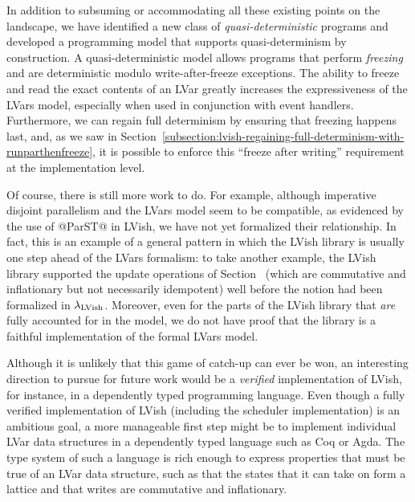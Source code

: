 In addition to subsuming or accommodating all these existing points on
the landscape, we have identified a new class of
\emph{quasi-deterministic} programs and developed a programming model
that supports quasi-determinism by construction.  A
quasi-deterministic model allows programs that perform \emph{freezing}
and are deterministic modulo write-after-freeze exceptions.  The
ability to freeze and read the exact contents of an LVar greatly
increases the expressiveness of the LVars model, especially when used
in conjunction with event handlers.  Furthermore, we can regain full
determinism by ensuring that freezing happens last, and, as we saw in
Section~\ref{subsection:lvish-regaining-full-determinism-with-runparthenfreeze},
it is possible to enforce this ``freeze after writing'' requirement at
the implementation level.

Of course, there is still more work to do.  For example, although
imperative disjoint parallelism and the LVars model seem to be
compatible, as evidenced by the use of @ParST@ in LVish, we have not
yet formalized their relationship.  In fact, this is an example of a
general pattern in which the LVish library is usually one step ahead
of the LVars formalism: to take another example, the LVish library
supported the update operations of
Section~\either{\ref{subsection:lvars-generalizing-from-least-upper-bound-writes}}{\ref{s:lvars-generalizing}}
(which are commutative and inflationary but not necessarily
idempotent) well before the notion had been formalized in
$\lambda_{\textrm{LVish}}$.  Moreover, even for the parts of the LVish library
that \emph{are} fully accounted for in the model, we do not have proof
that the library is a faithful implementation of the formal LVars
model.

Although it is unlikely that this game of catch-up can ever be won, an
interesting direction to pursue for future work would be a
\emph{verified} implementation of LVish, for instance, in a
dependently typed programming language.  Even though a fully verified
implementation of LVish (including the scheduler implementation) is an
ambitious goal, a more manageable first step might be to implement
individual LVar data structures in a dependently typed language such
as Coq or Agda.  The type system of such a language is rich enough to
express properties that must be true of an LVar data structure, such
as that the states that it can take on form a lattice and that writes
are commutative and inflationary.


